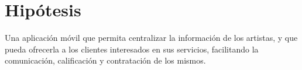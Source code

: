 \section{Hipótesis}
Una aplicación móvil que permita centralizar la información de los artistas, y que pueda ofrecerla a los clientes interesados en sus servicios, facilitando la comunicación, calificación y contratación de los mismos.